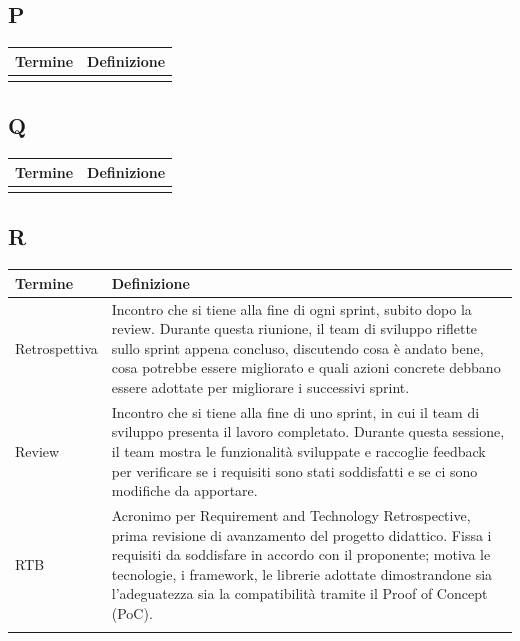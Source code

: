 \documentclass[10pt]{article}
\begin{document}
\subsection{P} %
\begin{tabularx}{\textwidth}{|>{\centering\arraybackslash}l|X|}
\hline
\rowcolor[gray]{0.8}
\textbf{Termine} & \textbf{Definizione}\\
\hline
 & \\
\hline
\end{tabularx}

\subsection{Q} %
\begin{tabularx}{\textwidth}{|>{\centering\arraybackslash}l|X|}
\hline
\rowcolor[gray]{0.8}
\textbf{Termine} & \textbf{Definizione}\\
\hline
 & \\
\hline
\end{tabularx}

\subsection{R} %
\begin{tabularx}{\textwidth}{|>{\centering\arraybackslash}l|X|}
\hline
\rowcolor[gray]{0.8}
\textbf{Termine} & \textbf{Definizione}\\
\hline
Retrospettiva & Incontro che si tiene alla fine di ogni sprint, subito dopo la review. Durante questa riunione, il team di sviluppo riflette sullo sprint appena concluso, discutendo cosa è andato bene, cosa potrebbe essere migliorato e quali azioni concrete debbano essere adottate per migliorare i successivi sprint.\\
\hline
Review & Incontro che si tiene alla fine di uno sprint, in cui il team di sviluppo presenta il lavoro completato. Durante questa sessione, il team mostra le funzionalità sviluppate e raccoglie feedback per verificare se i requisiti sono stati soddisfatti e se ci sono modifiche da apportare.\\
\hline
RTB & Acronimo per Requirement and Technology Retrospective, prima revisione di avanzamento del progetto didattico. Fissa i requisiti da soddisfare in accordo con il proponente; motiva le tecnologie, i framework, le librerie adottate dimostrandone sia l'adeguatezza sia la compatibilità tramite il Proof of Concept (PoC).\\
\hline
& \\
\hline
\end{tabularx}
\end{document}
